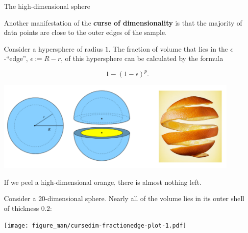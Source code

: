 \begin{vbframe}{The high-dimensional sphere}


Another manifestation of the \textbf{curse of dimensionality} is that the majority of data points are close to the outer edges of the sample.
 

Consider a hypersphere of radius $1$. The fraction of volume that lies in the $\epsilon$-\enquote{edge}, $\epsilon := R - r$, of this hypersphere can be calculated by the formula

\vspace*{-0.7cm}

$$
1-(1-\epsilon)^p.
$$

\vspace*{-0.5cm}

\begin{center}
\includegraphics[width=0.9\textwidth]{figure_man/orange.png}
\end{center}

\vspace*{-0.5cm}

If we peel a high-dimensional orange, there is almost nothing left. 

\flushleft


\framebreak

Consider a $20$-dimensional sphere. Nearly all of the volume lies in its outer shell of thickness $0.2$:
\medskip

\vspace*{0.1cm}
\begin{center}
\texttt{[image: figure\_man/cursedim-fractionedge-plot-1.pdf]}
\end{center}

\end{vbframe}

